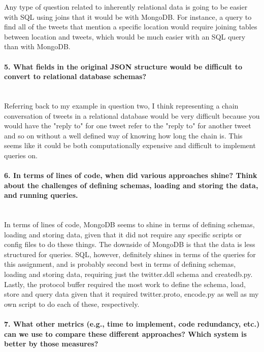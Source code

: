 \documentclass[12pt]{article}
\begin{document}
Any type of question related to inherently relational data is going to be easier with SQL using joins that it would be with MongoDB. For instance, a query to find all of the tweets that mention a specific location would require joining tables between location and tweets, which would be much easier with an SQL query than with MongoDB. 

\paragraph{5. What fields in the original JSON structure would be difficult to convert to relational database schemas?}\mbox{}\\

Referring back to my example in question two, I think representing a chain conversation of tweets in a relational database would be very difficult because you would have the "reply to" for one tweet refer to the "reply to" for another tweet and so on without a well defined way of knowing how long the chain is. This seems like it could be both computationally expensive and difficult to implement queries on. 

\paragraph{6. In terms of lines of code, when did various approaches shine? Think about the challenges of defining schemas, loading and storing the data, and running queries.}\mbox{}\\

In terms of lines of code, MongoDB seems to shine in terms of defining schemas, loading and storing data, given that it did not require any specific scripts or config files to do these things. The downside of MongoDB is that the data is less structured for queries. SQL, however, definitely shines in terms of the queries for this assignment, and is probably second best in terms of defining schemas, loading and storing data, requiring just the twitter.ddl schema and createdb.py. Lastly, the protocol buffer required the most work to define the schema, load, store and query data given that it required twitter.proto, encode.py as well as my own script to do each of these, respectively.   

\paragraph{7. What other metrics (e.g., time to implement, code redundancy, etc.) can we use to compare these different approaches? Which system is better by those measures?}\mbox{}\\
\end{document}
